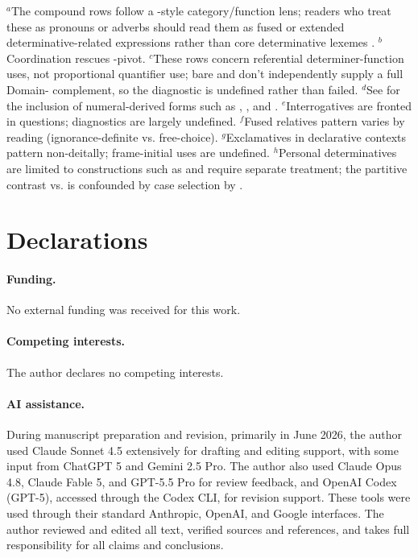 \documentclass[12pt,letterpaper]{article}
\newcommand{\PrepositionCitation}{%
  \ifdefined\blindsubmission
    \parencite{anonymous2025prepositions}%
  \else
    \parencite{Reynolds2025}%
  \fi}
\begin{document}
\noindent$^a$The compound rows follow a \CGEL-style category/function lens; readers who treat these as pronouns or adverbs should read them as fused or extended determinative-related expressions rather than core determinative lexemes \parencite{HuddlestonPullum2002}. $^b$Coordination rescues -pivot. $^c$These rows concern referential determiner-function uses, not proportional quantifier use; bare  and  don't independently supply a full Domain- complement, so the diagnostic is undefined rather than failed. $^d$See \PrepositionCitation{} for the inclusion of numeral-derived forms such as , , and . $^e$Interrogatives are fronted in questions; diagnostics are largely undefined. $^f$Fused relatives pattern varies by reading (ignorance-definite vs. free-choice). $^g$Exclamatives in declarative contexts pattern non-deitally; frame-initial uses are undefined. $^h$Personal determinatives are limited to constructions such as  and require separate treatment; the partitive contrast  vs.  is confounded by case selection by .
\par
\endgroup

\section*{Declarations}

\paragraph{Funding.} No external funding was received for this work.

\paragraph{Competing interests.} The author declares no competing interests.

\paragraph{AI assistance.} During manuscript preparation and revision, primarily in June 2026, the author used Claude Sonnet 4.5 extensively for drafting and editing support, with some input from ChatGPT 5 and Gemini 2.5 Pro. The author also used Claude Opus 4.8, Claude Fable 5, and GPT-5.5 Pro for review feedback, and OpenAI Codex (GPT-5), accessed through the Codex CLI, for revision support. These tools were used through their standard Anthropic, OpenAI, and Google interfaces. The author reviewed and edited all text, verified sources and references, and takes full responsibility for all claims and conclusions.

\clearpage
\printbibliography
\end{document}
